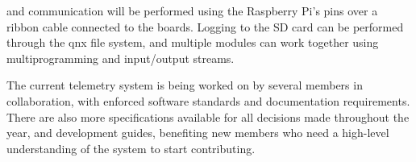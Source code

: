  and  communication will be performed using the Raspberry Pi's  pins
over a ribbon cable connected to the  boards. Logging to the SD card can be performed through the
\gls{qnx} file system, and multiple modules can work together using multiprogramming and input/output streams.

The current telemetry system is being worked on by several members in collaboration, with enforced software standards
and documentation requirements. There are also more specifications available for all decisions made throughout the
year, and development guides, benefiting new members who need a high-level understanding of the system to start
contributing.
